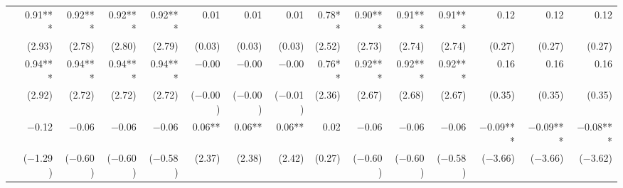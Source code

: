 \begin{tabularx}{1.45\textwidth}{lRRRRRRRRRRRRRR}
		 & \num{0.91}***\phantom{)} & \num{0.92}***\phantom{)} & \num{0.92}***\phantom{)} & \num{0.92}***\phantom{)} & \num{0.01}\phantom{***)} & \num{0.01}\phantom{***)} & \num{0.01}\phantom{***)} & \num{0.78}**\phantom{*)} & \num{0.90}***\phantom{)} & \num{0.91}***\phantom{)} & \num{0.91}***\phantom{)} & \num{0.12}\phantom{***)} & \num{0.12}\phantom{***)} & \num{0.12}\phantom{***)} \\
		 & (\num{2.93})\phantom{***} & (\num{2.78})\phantom{***} & (\num{2.80})\phantom{***} & (\num{2.79})\phantom{***} & (\num{0.03})\phantom{***} & (\num{0.03})\phantom{***} & (\num{0.03})\phantom{***} & (\num{2.52})\phantom{***} & (\num{2.73})\phantom{***} & (\num{2.74})\phantom{***} & (\num{2.74})\phantom{***} & (\num{0.27})\phantom{***} & (\num{0.27})\phantom{***} & (\num{0.27})\phantom{***} \\ [\dspacing]
		 & \num{0.94}***\phantom{)} & \num{0.94}***\phantom{)} & \num{0.94}***\phantom{)} & \num{0.94}***\phantom{)} & \num{-0.00}\phantom{***)} & \num{-0.00}\phantom{***)} & \num{-0.00}\phantom{***)} & \num{0.76}**\phantom{*)} & \num{0.92}***\phantom{)} & \num{0.92}***\phantom{)} & \num{0.92}***\phantom{)} & \num{0.16}\phantom{***)} & \num{0.16}\phantom{***)} & \num{0.16}\phantom{***)} \\
		 & (\num{2.92})\phantom{***} & (\num{2.72})\phantom{***} & (\num{2.72})\phantom{***} & (\num{2.72})\phantom{***} & (\num{-0.00})\phantom{***} & (\num{-0.00})\phantom{***} & (\num{-0.01})\phantom{***} & (\num{2.36})\phantom{***} & (\num{2.67})\phantom{***} & (\num{2.68})\phantom{***} & (\num{2.67})\phantom{***} & (\num{0.35})\phantom{***} & (\num{0.35})\phantom{***} & (\num{0.35})\phantom{***} \\ [\dspacing]
		 & \num{-0.12}\phantom{***)} & \num{-0.06}\phantom{***)} & \num{-0.06}\phantom{***)} & \num{-0.06}\phantom{***)} & \num{0.06}**\phantom{*)} & \num{0.06}**\phantom{*)} & \num{0.06}**\phantom{*)} & \num{0.02}\phantom{***)} & \num{-0.06}\phantom{***)} & \num{-0.06}\phantom{***)} & \num{-0.06}\phantom{***)} & \num{-0.09}***\phantom{)} & \num{-0.09}***\phantom{)} & \num{-0.08}***\phantom{)} \\
		 & (\num{-1.29})\phantom{***} & (\num{-0.60})\phantom{***} & (\num{-0.60})\phantom{***} & (\num{-0.58})\phantom{***} & (\num{2.37})\phantom{***} & (\num{2.38})\phantom{***} & (\num{2.42})\phantom{***} & (\num{0.27})\phantom{***} & (\num{-0.60})\phantom{***} & (\num{-0.60})\phantom{***} & (\num{-0.58})\phantom{***} & (\num{-3.66})\phantom{***} & (\num{-3.66})\phantom{***} & (\num{-3.62})\phantom{***} \\ [\dspacing]


\end{tabularx}
